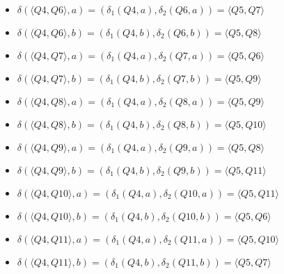 \documentclass[12pt, a4paper]{article}
\begin{document}
\begin{enumerate}
\begin{itemize}
\begin{itemize}
        \item \(\delta(\langle Q4,Q6 \rangle,a)=(\delta_1(Q4,a),\delta_2(Q6,a))=\langle Q5,Q7 \rangle\)
        \item \(\delta(\langle Q4,Q6 \rangle,b)=(\delta_1(Q4,b),\delta_2(Q6,b))=\langle Q5,Q8 \rangle\)
        \item \(\delta(\langle Q4,Q7 \rangle,a)=(\delta_1(Q4,a),\delta_2(Q7,a))=\langle Q5,Q6 \rangle\)
        \item \(\delta(\langle Q4,Q7 \rangle,b)=(\delta_1(Q4,b),\delta_2(Q7,b))=\langle Q5,Q9 \rangle\)
        \item \(\delta(\langle Q4,Q8 \rangle,a)=(\delta_1(Q4,a),\delta_2(Q8,a))=\langle Q5,Q9 \rangle\)
        \item \(\delta(\langle Q4,Q8 \rangle,b)=(\delta_1(Q4,b),\delta_2(Q8,b))=\langle Q5,Q10 \rangle\)
        \item \(\delta(\langle Q4,Q9 \rangle,a)=(\delta_1(Q4,a),\delta_2(Q9,a))=\langle Q5,Q8 \rangle\)
        \item \(\delta(\langle Q4,Q9 \rangle,b)=(\delta_1(Q4,b),\delta_2(Q9,b))=\langle Q5,Q11 \rangle\)
        \item \(\delta(\langle Q4,Q10 \rangle,a)=(\delta_1(Q4,a),\delta_2(Q10,a))=\langle Q5,Q11 \rangle\)
        \item \(\delta(\langle Q4,Q10 \rangle,b)=(\delta_1(Q4,b),\delta_2(Q10,b))=\langle Q5,Q6 \rangle\)
        \item \(\delta(\langle Q4,Q11 \rangle,a)=(\delta_1(Q4,a),\delta_2(Q11,a))=\langle Q5,Q10 \rangle\)
        \item \(\delta(\langle Q4,Q11 \rangle,b)=(\delta_1(Q4,b),\delta_2(Q11,b))=\langle Q5,Q7 \rangle\)
        

\end{itemize}
\end{itemize}
\end{enumerate}
\end{document}
